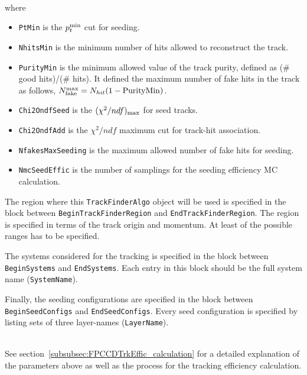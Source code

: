 ~\\
\noindent
where 

\begin{itemize}
  \item  {\tt PtMin} is the $p^{\rm min}_t$ cut for seeding.
  
  \item  {\tt NhitsMin} is the minimum number of hits allowed to reconstruct the track.
  
  \item  {\tt PurityMin} is the minimum allowed value of the track purity, defined as (\# good hits)/(\# hits). It defined the maximum number of 
  fake hits in the track as follows, $N^{\rm max}_{\rm fake} = N_{hit}(1 - {\rm PurityMin})$.

  \item  {\tt Chi2OndfSeed} is the $(\chi^2/ndf)_{\rm max}$ for seed tracks.
  
  \item  {\tt Chi2OndfAdd} is the $\chi^2/ndf$ maximum cut for track-hit association.
  
  \item  {\tt NfakesMaxSeeding} is the maximum allowed number of fake hits for seeding.
  
  \item  {\tt NmcSeedEffic} is the number of samplings for the seeding efficiency MC calculation.
\end{itemize}

The region where this {\tt TrackFinderAlgo} object will be used is specified in the block between {\tt BeginTrackFinderRegion} and 
{\tt EndTrackFinderRegion}. The region is specified in terms of the track origin and momentum. At least of the possible ranges has to be specified.

The systems considered for the tracking is specified in the block between {\tt BeginSystems} and {\tt EndSystems}. Each entry in this block 
should be the full system name ({\tt SystemName}).

Finally, the seeding configurations are specified in the block between {\tt BeginSeedConfigs} and {\tt EndSeedConfigs}. Every seed 
configuration is specified by listing sets of three layer-names ({\tt LayerName}).

~\\
\noindent
See section~\ref{subsubsec:FPCCDTrkEffic_calculation} for a detailed explanation of the parameters above as well as the process for the tracking efficiency calculation.

